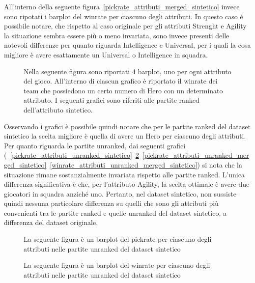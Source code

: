 All'interno della seguente figura~\ref{pickrate_attributi_merged_sintetico} invece sono ripotati i barplot del winrate per ciascuno degli attributi. In questo caso è possibile notare, che rispetto al caso originale per gli attributi Strenght e Agility la situazione sembra essere più o meno invariata, sono invece presenti delle notevoli differenze per quanto riguarda Intelligence e Universal, per i quali la cosa migliore è avere esattamente un Universal o Intelligence in squadra.
\begin{figure}[htbp]
\begin{center}

\caption{Nella seguente figura sono riportati 4 barplot, uno per ogni attributo del gioco. All'interno di ciascun grafico è riportato il winrate dei team che possiedono un certo numero di Hero con un determinato attributo. I seguenti grafici sono riferiti alle partite ranked dell'attributo sintetico.}
\label{winrate_attributi_merged_sintetico}
\end{center}
\end{figure}
Osservando i grafici è possibile quindi notare che per le partite ranked del dataset sintetico la scelta migliore è quella di avere un Hero per ciascuno degli attributi. 
Per quanto riguarda le partite unranked, dai seguenti grafici (~\ref{pickrate_attributi_unranked_sintetico}~\ref{winrate_attributi_unranked_sintetico}~\ref{pickrate_attributi_unranked_merged_sintetico}~\ref{winrate_attributi_unranked_merged_sintetico}) si nota che la situazione rimane sostanzialmente invariata rispetto alle partite ranked. L'unica differenza significativa è che, per l'attributo Agility, la scelta ottimale è avere due giocatori in squadra anziché uno. Pertanto, nel dataset sintetico, non sussiste quindi nessuna particolare differenza su quelli che sono gli attributi più convenienti tra le partite ranked e quelle unranked del dataset sintetico, a differenza del dataset originale.
\begin{figure}[htbp]
\centering
\begin{multicols}{2}
\hspace*{-0.2\linewidth}

\caption{La seguente figura è un barplot del pickrate per ciascuno degli attributi nelle partite unranked del dataset sintetico}
\label{pickrate_attributi_unranked_sintetico}
\hspace*{-0.1\linewidth}

\caption{ La seguente figura è un barplot del winrate per ciascuno degli attributi nelle partite unranked del dataset sintetico }
\label{winrate_attributi_unranked_sintetico}
\end{multicols}
\end{figure} 
